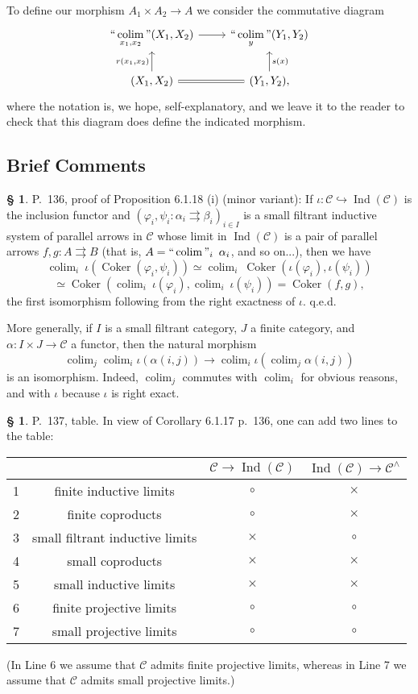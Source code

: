 \documentclass[12pt]{article}
\theoremstyle{remark}
\theoremstyle{definition}
\newtheorem{s}[thm]{\S}
\newcommand{\C}{\mathcal C}
\newcommand{\parar}{\rightrightarrows}\newcommand{\paralelarrows}{\rightrightarrows}%
\newcommand{\mv}{ (minor variant)}
\newcommand{\bc}{\subsection{Brief Comments}}
\DeclareMathOperator*{\coli}{colim}
\DeclareMathOperator*{\co}{colim}
\DeclareMathOperator*{\ic}{``\coli"}
\DeclareMathOperator{\Coker}{Coker}
\DeclareMathOperator{\Ind}{Ind}
\begin{document}
To define our morphism $A_1\times A_2\to A$ we consider the commutative diagram
$$
\begin{tikzcd}
\displaystyle\ic_{x_1,x_2}(X_1,X_2)\ar{r}&\displaystyle\ic_y(Y_1,Y_2)\\ 
(X_1,X_2)\ar{u}{r(x_1,x_2)}\ar[equal]{r}&(Y_1,Y_2),\ar{u}[swap]{s(x)}
\end{tikzcd}
$$ 
where the notation is, we hope, self-explanatory, and we leave it to the reader to check that this diagram does define the indicated morphism.
%
%
\bc
%
\begin{s} 
P.~136, proof of Proposition 6.1.18 (i)\mv: If $\iota:\C\hookrightarrow\Ind(\C)$ is the inclusion functor and $(\varphi_i,\psi_i:\alpha_i\parar\beta_i)_{i\in I}$ is a small filtrant inductive system of parallel arrows in $\C$ whose limit in $\Ind(\C)$ is a pair of parallel arrows $f,g:A\parar B$ (that is, $A=\ic_i\ \alpha_i$, and so on...), then we have 
$$
\co_i\ \iota(\Coker(\varphi_i,\psi_i))\simeq
\co_i\ \Coker(\iota(\varphi_i),\iota(\psi_i))
$$
$$
\simeq
\Coker(\co_i\ \iota(\varphi_i),\co_i\ \iota(\psi_i))=
\Coker(f,g),
$$ 
the first isomorphism following from the right exactness of $\iota$. q.e.d.

More generally, if $I$ is a small filtrant category, $J$ a finite category, and $\alpha:I\times J\to\C$ a functor, then the natural morphism 
$$
\co_j\co_i\iota(\alpha(i,j))\to\co_i\iota\left(\co_j\alpha(i,j)\right) 
$$ 
is an isomorphism. Indeed, $\co_j$ commutes with $\co_i$ for obvious reasons, and with $\iota$ because $\iota$ is right exact.
\end{s}
%
%
\begin{s} 
P.~137, table. In view of Corollary 6.1.17 p.~136, one can add two lines to the table:\bigskip 

\begin{center}
\begin{tabular}{|c|c|c|c|}\hline
&&$\C\to\Ind(\C)$&$\Ind(\C)\to\C^\wedge$\\ \hline
1&finite inductive limits&$\circ$&$\times$\\ \hline
2&finite coproducts&$\circ$&$\times$\\ \hline
3&small filtrant inductive limits&$\times$&$\circ$\\ \hline
4&small coproducts&$\times$&$\times$\\ \hline
5&small inductive limits&$\times$&$\times$\\ \hline
6&finite projective limits&$\circ$&$\circ$\\ \hline
7&small projective limits&$\circ$&$\circ$\\ \hline
\end{tabular}
\end{center}%
\noindent(In Line 6 we assume that $\C$ admits finite projective limits, whereas in Line 7 we assume that $\C$ admits small projective limits.)%
\end{s}
\end{document}
